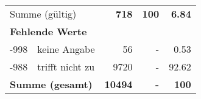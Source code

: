 \begin{longtable}{lXrrr}
     \midrule
     \multicolumn{2}{l}{Summe (gültig)} &
       \textbf{\num{718}} &
     \textbf{100} &
       \textbf{\num[round-mode=places,round-precision=2]{6,84}} \\
     \multicolumn{5}{l}{\textbf{Fehlende Werte}}\\
       -998 &
       keine Angabe &
         \num{56} &
        - &
         \num[round-mode=places,round-precision=2]{0,53} \\
       -988 &
       trifft nicht zu &
         \num{9720} &
        - &
         \num[round-mode=places,round-precision=2]{92,62} \\
     \midrule
     \multicolumn{2}{l}{\textbf{Summe (gesamt)}} &
          \textbf{\num{10494}} &
        \textbf{-} &
        \textbf{100} \\
     \bottomrule
     \end{longtable}
     
